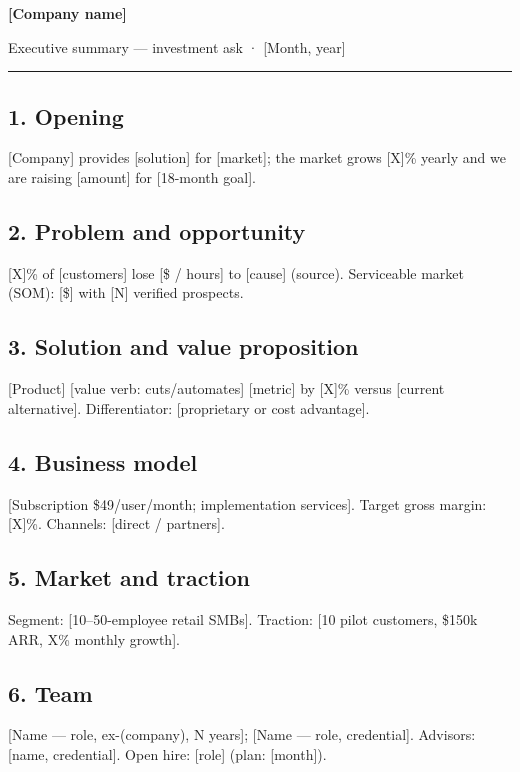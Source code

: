 \documentclass[11pt]{article}
\renewcommand{\tituloProyecto}{[Company name]}
\renewcommand{\subtituloProyecto}{Executive summary — investment ask}
\renewcommand{\fechaProyecto}{[Month, year]}
\begin{document}
\begin{center}
  {\large\bfseries\tituloProyecto\par}
  \vspace{2pt}
  {\small\subtituloProyecto{} · \fechaProyecto\par}
  {\color{bftCoral}\rule{0.3\textwidth}{1.5pt}\par}
\end{center}

\subsection*{1. Opening}
[Company] provides [solution] for [market]; the market grows [X]\% yearly
and we are raising [amount] for [18-month goal].

\subsection*{2. Problem and opportunity}
[X]\% of [customers] lose [\$ / hours] to [cause] (source). Serviceable
market (SOM): [\$] with [N] verified prospects.

\subsection*{3. Solution and value proposition}
[Product] [value verb: cuts/automates] [metric] by [X]\% versus [current
alternative]. Differentiator: [proprietary or cost advantage].

\subsection*{4. Business model}
[Subscription \$49/user/month; implementation services]. Target gross
margin: [X]\%. Channels: [direct / partners].

\subsection*{5. Market and traction}
Segment: [10–50-employee retail SMBs]. Traction: [10 pilot customers,
\$150k ARR, X\% monthly growth].

\subsection*{6. Team}
[Name — role, ex-(company), N years]; [Name — role, credential].
Advisors: [name, credential]. Open hire: [role] (plan: [month]).
\end{document}
